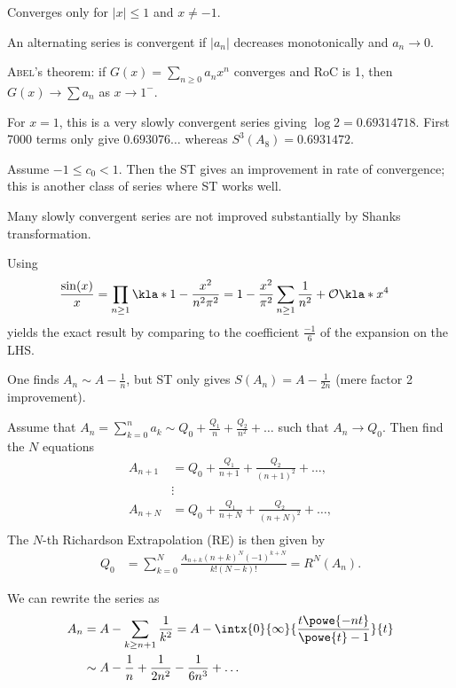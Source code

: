 \documentclass[english, parskip=full]{scrbook}
\newcommand{\definition}[2]{\begin{tcolorbox}[colback=colorbackgrounddefinition,colframe=colordefinition, breakable,enhanced,title=\textbf{#1}.]#2\end{tcolorbox}}
\newcommand{\note}[1]{\begin{tcolorbox}[colback=colorbackgroundnote,colframe=colornote, breakable,enhanced]#1\end{tcolorbox}}
\newcommand{\example}[3]{\begin{tcolorbox}[colback=colorbackgroundexample,colframe=colorexample, breakable,enhanced,title={\textbf{#1}: #2.}]#3\end{tcolorbox}}
\begin{document}
\example{Branch point singularity}{$\log(1+x) = \sum_{k\ge 1} (-1)^{k+1} \frac{1}{k} x^k$}{
Converges only for $|x|\le 1$ and $x\neq -1$.
\note{
An alternating series is convergent if $|a_n|$ decreases monotonically and $a_n\rightarrow 0$.

\textsc{Abel}'s theorem: if $G(x) = \sum_{n\ge 0} a_nx^n$ converges and RoC is 1, then $G(x) \rightarrow \sum a_n$ as $x\rightarrow 1^-$.
}
For $x=1$, this is a very slowly convergent series giving $\log 2=0.69314718$.
First 7000 terms only give $0.693076\dots$ whereas $S^3(A_8)=0.6931472$.
}
\example{Inverse power series}{$\sum a_n$ with $\frac{a_{n+1}}{a_n} \sim c_0 + \frac{c_1}{n} + \frac{c_2}{n^2} + \dots$ as $n\rightarrow \infty$}{
Assume $-1\le c_0 < 1$.
Then the ST gives an improvement in rate of convergence; this is another class of series where ST works well.
}
\definition{Richardson Extrapolation}{
Many slowly convergent series are not improved substantially by Shanks transformation.
\example{Basel Problem}{$\sum_{n\ge 1} \frac{1}{n^2} = \frac{\pi^2}{6}$}{
Using 
\begin{align}
\frac{\sin(x)}{x} &= \prod_{n\ge 1} \kla*{1 - \frac{x^2}{n^2\pi^2}} = 1 - \frac{x^2}{\pi^2} \sum_{n\ge 1} \frac{1}{n^2} + \mathcal{O}\kla*{x^4}
\end{align}
yields the exact result by comparing to the coefficient $\frac{-1}{6}$ of the expansion on the LHS.

One finds $A_n \sim A - \frac{1}{n}$, but ST only gives $S(A_n) = A - \frac{1}{2n}$ (mere factor 2 improvement).
}
Assume that $A_n=\sum_{k=0}^n a_k \sim Q_0 + \frac{Q_1}{n} + \frac{Q_2}{n^2} + \dots $ such that $A_n \rightarrow Q_0$.
Then find the $N$ equations
\begin{align}
A_{n+1} &= Q_0 + \frac{Q_1}{n+1} + \frac{Q_2}{(n+1)^2} + \dots,\\
&\vdots\\
A_{n+N} &= Q_0 + \frac{Q_1}{n+N} + \frac{Q_2}{(n+N)^2} + \dots,\\
\end{align}
The $N$-th Richardson Extrapolation (RE) is then given by
\begin{align}
Q_0 &= \sum_{k=0}^N \frac{A_{n+k} (n+k)^N (-1)^{k+N}}{k! (N-k)!} = R^N(A_n).
\end{align}
}
\example{Basel Problem (again)}{IbP}{
We can rewrite the series as
\begin{align}
A_n &= A - \sum_{k\ge n+1} \frac{1}{k^2} = A - \intx{0}{\infty}{\frac{t\powe{-nt}}{\powe{t} - 1}}{t}\\
&\sim A - \frac{1}{n} + \frac{1}{2n^2} - \frac{1}{6n^3} + \dots
\end{align}
}
\end{document}
